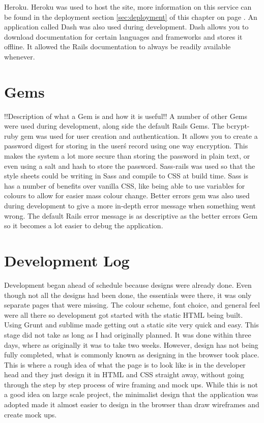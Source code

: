 Heroku. Heroku \citep{heroku:2007} was used to host the site, more information on this service can be found in the deployment section \ref{sec:deployment} of this chapter on page \pageref{sec:deployment}. An application called Dash \citep{dash:2014} was also used during development. Dash allows you to download documentation for certain languages and frameworks and stores it offline. It allowed the Rails documentation to always be readily available whenever.

\section{Gems}
!!Description of what a Gem is and how it is useful!! A number of other Gems were used during development, along side the default Rails Gems. The bcrypt-ruby gem was used for user creation and authentication. It allows you to create a password digest for storing in the user\'s record using one way encryption. This makes the system a lot more secure than storing the password in plain text, or even using a salt and hash to store the password. Sass-rails was used so that the style sheets could be writing in Sass and compile to CSS at build time. Sass is has a number of benefits over vanilla CSS, like being able to use variables for colours to allow for easier mass colour change. Better errors gem was also used during development to give a more in-depth error message when something went wrong. The default Rails error message is as descriptive as the better errors Gem so it becomes a lot easier to debug the application.

\section{Development Log}
Development began ahead of schedule because designs were already done. Even though not all the designs had been done, the essentials were there, it was only separate pages that were missing. The colour scheme, font choice, and general feel were all there so development got started with the static HTML being built. Using Grunt \citep{grunt:2013} and sublime made getting out a static site very quick and easy. This stage did not take as long as I had originally planned. It was done within three days, where as originally it was to take two weeks. However, design has not being fully completed, what is commonly known as designing in the browser took place. This is where a rough idea of what the page is to look like is in the developer head and they just design it in HTML and CSS straight away, without going through the step by step process of wire framing and mock ups. While this is not a good idea on large scale project, the minimalist design that the application was adopted made it almost easier to design in the browser than draw wireframes and create mock ups.\\

